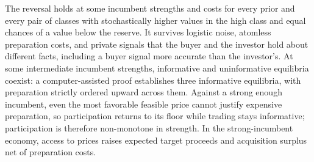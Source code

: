 The reversal holds at some incumbent strengths and costs for every prior and every pair of classes with stochastically higher values in the high class and equal chances of a value below the reserve. It survives logistic noise, atomless preparation costs, and private signals that the buyer and the investor hold about different facts, including a buyer signal more accurate than the investor's. At some intermediate incumbent strengths, informative and uninformative equilibria coexist: a computer-assisted proof establishes three informative equilibria, with preparation strictly ordered upward across them. Against a strong enough incumbent, even the most favorable feasible price cannot justify expensive preparation, so participation returns to its floor while trading stays informative; participation is therefore non-monotone in strength. In the strong-incumbent economy, access to prices raises expected target proceeds and acquisition surplus net of preparation costs.

